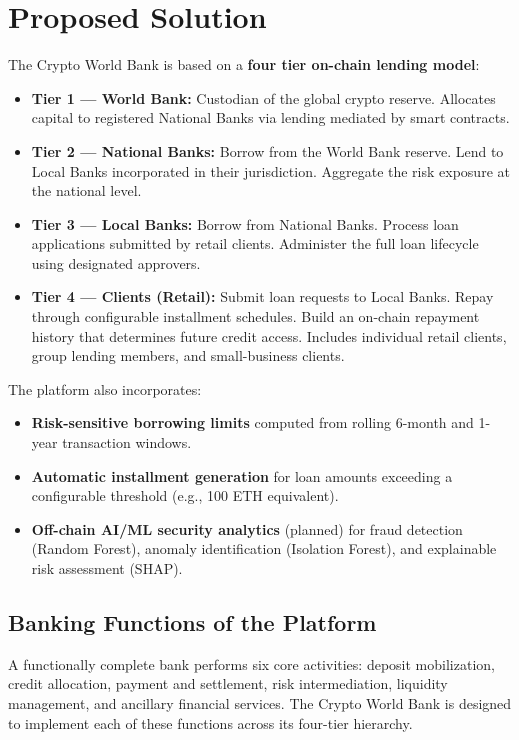 \documentclass[12pt,a4paper]{report}
\begin{document}
\section{Proposed Solution}
\label{sec:proposed-solution}

The Crypto World Bank is based on a \textbf{four tier on-chain lending model}:

\begin{itemize}[noitemsep]
\item \textbf{Tier 1 --- World Bank:} Custodian of the global crypto reserve. Allocates capital to registered National Banks via lending mediated by smart contracts.
\item \textbf{Tier 2 --- National Banks:} Borrow from the World Bank reserve. Lend to Local Banks incorporated in their jurisdiction. Aggregate the risk exposure at the national level.
\item \textbf{Tier 3 --- Local Banks:} Borrow from National Banks. Process loan applications submitted by retail clients. Administer the full loan lifecycle using designated approvers.
\item \textbf{Tier 4 --- Clients (Retail):} Submit loan requests to Local Banks. Repay through configurable installment schedules. Build an on-chain repayment history that determines future credit access. Includes individual retail clients, group lending members, and small-business clients.
\end{itemize}

The platform also incorporates:

\begin{itemize}[noitemsep]
\item \textbf{Risk-sensitive borrowing limits} computed from rolling 6-month and 1-year transaction windows.
\item \textbf{Automatic installment generation} for loan amounts exceeding a configurable threshold (e.g., 100 ETH equivalent).
\item \textbf{Off-chain AI/ML security analytics} (planned) for fraud detection (Random Forest), anomaly identification (Isolation Forest), and explainable risk assessment (SHAP).
\end{itemize}

\subsection{Banking Functions of the Platform}

A functionally complete bank performs six core activities: deposit mobilization, credit allocation, payment and settlement, risk intermediation, liquidity management, and ancillary financial services. The Crypto World Bank is designed to implement each of these functions across its four-tier hierarchy.
\end{document}
